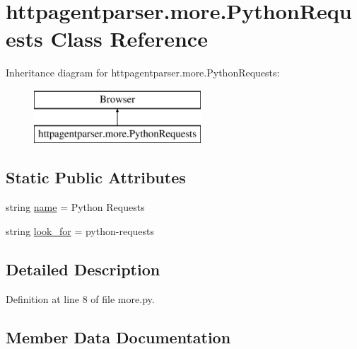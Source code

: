 \hypertarget{classhttpagentparser_1_1more_1_1_python_requests}{}\section{httpagentparser.\+more.\+Python\+Requests Class Reference}
\label{classhttpagentparser_1_1more_1_1_python_requests}
Inheritance diagram for httpagentparser.\+more.\+Python\+Requests\+:\begin{figure}[H]
\begin{center}
\leavevmode
\includegraphics[height=2.000000cm]{classhttpagentparser_1_1more_1_1_python_requests}
\end{center}
\end{figure}
\subsection*{Static Public Attributes}
\begin{DoxyCompactItemize}
\item 
string \hyperlink{classhttpagentparser_1_1more_1_1_python_requests_a5bc8a2f14cd3918a6a601510a0985ac6}{name} = \textquotesingle{}Python Requests\textquotesingle{}
\item 
string \hyperlink{classhttpagentparser_1_1more_1_1_python_requests_a2aeb76c813d0648356e1b94dc96b430b}{look\+\_\+for} = \textquotesingle{}python-\/requests\textquotesingle{}
\end{DoxyCompactItemize}


\subsection{Detailed Description}


Definition at line 8 of file more.\+py.



\subsection{Member Data Documentation}
\hypertarget{classhttpagentparser_1_1more_1_1_python_requests_a2aeb76c813d0648356e1b94dc96b430b}{}\label{classhttpagentparser_1_1more_1_1_python_requests_a2aeb76c813d0648356e1b94dc96b430b} 
